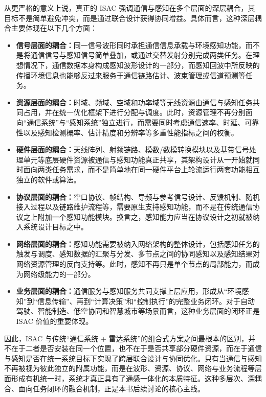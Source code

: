 从更严格的意义上说，真正的 ISAC 强调通信与感知在多个层面的深层耦合，其目标不是简单避免冲突，而是通过联合设计获得协同增益\cite{Liu2022ISAC,Zhang2021ISAC6G}。具体而言，这种深层耦合主要体现在以下几个方面：

\begin{itemize}
    \item \textbf{信号层面的耦合：}同一信号波形同时承担通信信息承载与环境感知功能，而不是将通信信号与感知信号简单叠加，或通过交替发射分别完成两类任务。在理想情况下，通信数据本身构成感知波形设计的一部分，而感知回波中所反映的传播环境信息也能够反过来服务于通信链路估计、波束管理或信道预测等任务。

    \item \textbf{资源层面的耦合：}时域、频域、空域和功率域等无线资源由通信与感知任务共同占用，并在统一优化框架下进行分配与调度。此时，资源管理不再分别面向“通信系统”与“感知系统”独立进行，而需要同时考虑通信速率、时延、可靠性以及感知检测概率、估计精度和分辨率等多重性能指标之间的权衡。

    \item \textbf{硬件层面的耦合：}天线阵列、射频链路、模数/数模转换模块以及基带信号处理单元等底层硬件资源被通信与感知功能真正共享，其架构设计从一开始就同时面向两类任务需求，而不是简单地在同一硬件平台上轮流运行两套功能相互独立的软件或算法。

    \item \textbf{协议层面的耦合：}空口协议、帧结构、导频与参考信号设计、反馈机制、随机接入过程以及链路维护流程等，需要原生支持感知功能，而不是在传统通信协议之上附加一个感知功能模块。换言之，感知能力应当在协议设计之初就被纳入系统设计目标之中。

    \item \textbf{网络层面的耦合：}感知功能需要被纳入网络架构的整体设计，包括感知任务的触发与调度、感知数据的汇聚与分发、多节点之间的协同感知以及感知结果对网络资源管理的反向支持等。此时，感知不再只是单个节点的局部能力，而成为网络级能力的一部分。

    \item \textbf{业务层面的耦合：}通信服务与感知服务共同支撑上层应用，形成从“环境感知”到“信息传输”、再到“计算决策”和“控制执行”的完整业务闭环。对于自动驾驶、智能制造、低空协同和智慧城市等场景而言，这种业务层面的闭环正是 ISAC 价值的重要体现。
\end{itemize}

因此，ISAC 与传统“通信系统 + 雷达系统”的组合式方案之间最根本的区别，并不在于二者是否安装在同一个位置，也不在于是否共享部分硬件资源，而在于通信与感知是否在统一系统目标下实现了跨层联合设计与协同优化。只有当通信与感知不再被视为彼此独立的附属功能，而是在波形、资源、协议、网络与业务流程等层面形成有机统一时，系统才真正具有了通感一体化的本质特征。这种多层次、深耦合、面向任务闭环的融合机制，正是本书后续讨论的核心主线。

